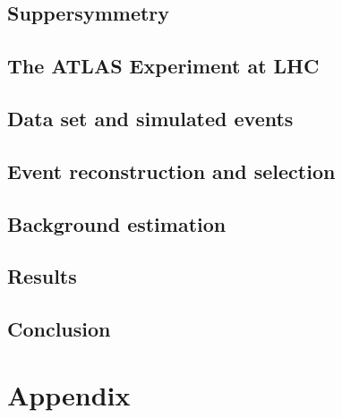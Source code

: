 \documentclass[hyperlinks]{outhesis}
\begin{document}
\chapter{Suppersymmetry}
\label{chapter:Suppersymmetry}
\graphicspath{{figures/susy/}}



\chapter{The ATLAS Experiment at LHC}
\label{chapter:altas_experiment}
\graphicspath{{figures/atlas_experiment/}}



\chapter{Data set and simulated events}
\label{chapter:data}
\graphicspath{{figures/data/}}


\chapter{Event reconstruction and selection}
\label{chapter:event_reconstruction_and_selection}
\graphicspath{{figures/event_reconstruction/}}


\chapter{Background estimation}
\label{chapter:bkg_estimation}
\graphicspath{{figures/bkg_estimation/}}


\chapter{Results}
\label{chapter:results}
\graphicspath{{figures/results}}


\chapter{Conclusion}
\label{chapter:conclusion}
\graphicspath{{figures/conclusion/}}



\clearpage

\appendix
\part*{Appendix}
\end{document}
